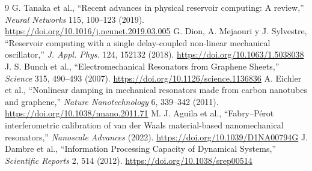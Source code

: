 \documentclass[11pt,a4paper]{article}
\begin{document}
{\small
\begin{thebibliography}{9}
\setlength{\itemsep}{0.15em}
 G. Tanaka et al., ``Recent advances in physical reservoir computing: A review,'' \emph{Neural Networks} 115, 100--123 (2019). \url{https://doi.org/10.1016/j.neunet.2019.03.005}
 G. Dion, A. Mejaouri y J. Sylvestre, ``Reservoir computing with a single delay-coupled non-linear mechanical oscillator,'' \emph{J. Appl. Phys.} 124, 152132 (2018). \url{https://doi.org/10.1063/1.5038038}
 J. S. Bunch et al., ``Electromechanical Resonators from Graphene Sheets,'' \emph{Science} 315, 490--493 (2007). \url{https://doi.org/10.1126/science.1136836}
 A. Eichler et al., ``Nonlinear damping in mechanical resonators made from carbon nanotubes and graphene,'' \emph{Nature Nanotechnology} 6, 339--342 (2011). \url{https://doi.org/10.1038/nnano.2011.71}
 M. J. Aguila et al., ``Fabry--Pérot interferometric calibration of van der Waals material-based nanomechanical resonators,'' \emph{Nanoscale Advances} (2022). \url{https://doi.org/10.1039/D1NA00794G}
 J. Dambre et al., ``Information Processing Capacity of Dynamical Systems,'' \emph{Scientific Reports} 2, 514 (2012). \url{https://doi.org/10.1038/srep00514}
\end{thebibliography}
}
\end{document}
